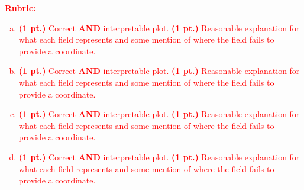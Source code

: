 \documentclass[12pt]{article} %
\begin{document}
\textcolor{red}{
\noindent \textbf{Rubric:}
\begin{enumerate}[(a)]
    \item \textbf{(1 pt.)} Correct \textbf{AND} interpretable plot. \textbf{(1 pt.)} Reasonable explanation for what each field represents and some mention of where the field fails to provide a coordinate.
    \item \textbf{(1 pt.)} Correct \textbf{AND} interpretable plot. \textbf{(1 pt.)} Reasonable explanation for what each field represents and some mention of where the field fails to provide a coordinate.
    \item \textbf{(1 pt.)} Correct \textbf{AND} interpretable plot. \textbf{(1 pt.)} Reasonable explanation for what each field represents and some mention of where the field fails to provide a coordinate.
    \item \textbf{(1 pt.)} Correct \textbf{AND} interpretable plot. \textbf{(1 pt.)} Reasonable explanation for what each field represents and some mention of where the field fails to provide a coordinate.
\end{enumerate}
}
\end{document}
